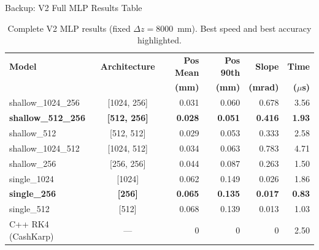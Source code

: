 \documentclass[aspectratio=169, 11pt]{beamer}
\newcommand{\dz}{\Delta z}
\begin{document}
\begin{frame}{Backup: V2 Full MLP Results Table}

\begin{table}
\centering\scriptsize
\begin{tabular}{@{} l c r r r r @{}}
  \toprule
  \textbf{Model} & \textbf{Architecture} & \textbf{Pos Mean} &
    \textbf{Pos 90th} & \textbf{Slope} & \textbf{Time} \\
  & & \textbf{(mm)} & \textbf{(mm)} & \textbf{(mrad)} & \textbf{($\mu$s)} \\
  \midrule
  shallow\_1024\_256 & [1024, 256] & 0.031 & 0.060 & 0.678 & 3.56 \\
  \rowcolor{nngreen!10}
  \textbf{shallow\_512\_256} & \textbf{[512, 256]} & \textbf{0.028} &
    \textbf{0.051} & \textbf{0.416} & \textbf{1.93} \\
  shallow\_512       & [512, 512]  & 0.029 & 0.053 & 0.333 & 2.58 \\
  shallow\_1024\_512 & [1024, 512] & 0.034 & 0.063 & 0.783 & 4.71 \\
  shallow\_256       & [256, 256]  & 0.044 & 0.087 & 0.263 & 1.50 \\
  single\_1024       & [1024]      & 0.062 & 0.149 & 0.026 & 1.86 \\
  \rowcolor{nngreen!10}
  \textbf{single\_256} & \textbf{[256]} & \textbf{0.065} &
    \textbf{0.135} & \textbf{0.017} & \textbf{0.83} \\
  single\_512        & [512]       & 0.068 & 0.139 & 0.013 & 1.03 \\
  \midrule
  C++ RK4 (CashKarp) & --- & 0 & 0 & 0 & 2.50 \\
  \bottomrule
\end{tabular}
\caption*{\scriptsize Complete V2 MLP results (fixed $\dz = 8000$~mm).
          Best speed and best accuracy highlighted.}
\end{table}
\end{frame}
\end{document}
